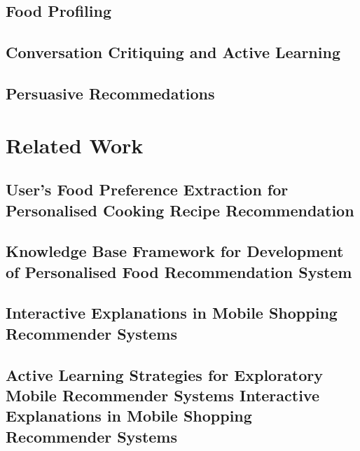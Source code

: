 \subsection{Food Profiling}

\subsection{Conversation Critiquing and Active Learning}

\subsection{Persuasive Recommedations}

\section{Related Work}

\subsection{User's Food Preference Extraction for Personalised Cooking Recipe Recommendation}

\subsection{Knowledge Base Framework for Development of Personalised Food Recommendation System}

\subsection{Interactive Explanations in Mobile Shopping Recommender Systems}

\subsection{Active Learning Strategies for Exploratory Mobile Recommender Systems Interactive Explanations in Mobile Shopping Recommender Systems}